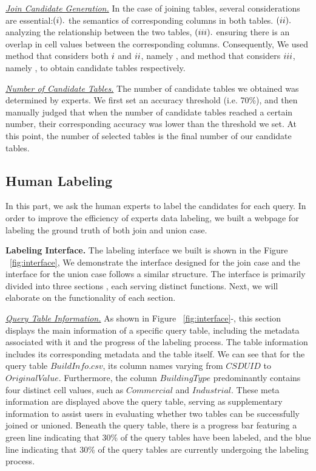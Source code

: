 \noindent \underline{\textit{Join Candidate Generation.}}  
In the case of joining tables, several considerations are essential:$(\romannumeral1).$ the semantics of corresponding columns in both tables. $(\romannumeral2).$ analyzing the relationship between the two tables, $(\romannumeral3).$ ensuring there is an overlap in cell values between the corresponding columns. Consequently, We used method that considers both $\romannumeral1$ and $\romannumeral2$, namely \deepjoin, and method that considers $\romannumeral3$, namely \josie, to obtain candidate tables respectively.

\noindent  \underline{\textit{Number of Candidate Tables.}}  The number of candidate tables we obtained was determined by experts. We first set an accuracy threshold (i.e. 70\%), and then manually judged that when the number of candidate tables reached a certain number, their corresponding accuracy was lower than the threshold we set. At this point, the number of selected tables is the final number of our candidate tables.


\subsection{Human Labeling}
In this part, we ask the human experts to label the candidates for each query. In order to improve the efficiency of experts data labeling, we built a webpage for labeling the ground truth of both join and union case.


\noindent \textbf{Labeling Interface.} 
The labeling interface we built is shown in the Figure ~\ref{fig:interface}, We demonstrate the interface designed for the join case and the interface for the union case follows a similar structure. The interface is primarily divided into three sections , each serving distinct functions. Next, we will elaborate on the functionality of each section.

\noindent \underline{\textit{Query Table Information.}}  
As shown in Figure ~\ref{fig:interface}-, this section 
displays the main information of a specific query table, including the metadata associated with it and the progress of the labeling process. The table information  includes its corresponding metadata and the table itself. We can see that for the query table $BuildInfo.csv$, its column names varying from $CSDUID$ to $OriginalValue$. Furthermore, the column $Building Type$ predominantly contains four distinct cell values, such as $Commercial$ and $Industrial$. These meta information are displayed above the query table, serving as supplementary information to assist users in  evaluating whether two tables can be successfully joined or unioned. Beneath the query table, there is a progress bar featuring a green line indicating that 30\% of the query tables have been labeled, and the blue line indicating that 30\% of the query tables are currently undergoing the labeling process.


